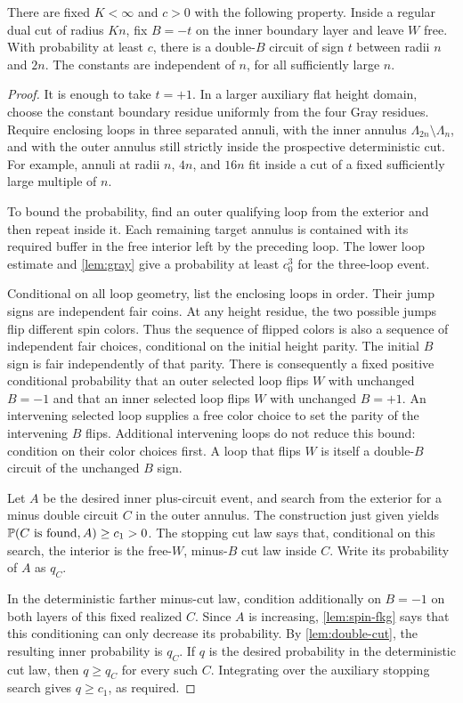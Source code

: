\begin{lemma}\label{lem:worst-cut}
There are fixed $K<\infty$ and $c>0$ with the following property.
Inside a regular dual cut of radius $Kn$, fix $B=-t$ on the inner boundary
layer and leave $W$ free.  With probability at least $c$, there is a
double-$B$ circuit of sign $t$ between radii $n$ and $2n$.  The constants
are independent of $n$, for all sufficiently large $n$.
\end{lemma}

\begin{proof}
It is enough to take $t=+1$.  In a larger auxiliary flat height domain,
choose the constant boundary residue uniformly from the four Gray
residues.  Require enclosing loops in three separated annuli, with the
inner annulus $\Lambda_{2n}\setminus\Lambda_n$, and with the outer
annulus still strictly inside the prospective deterministic cut.  For
example, annuli at radii $n$, $4n$, and $16n$ fit inside a cut of a fixed
sufficiently large multiple of $n$.

To bound the probability, find an outer qualifying loop from the exterior
and then repeat inside it.  Each remaining target annulus is contained
with its required buffer in the free interior left by the preceding loop.
The lower loop estimate and \cref{lem:gray} give a probability at least
$c_0^3$ for the three-loop event.

Conditional on all loop geometry, list the enclosing loops in order.
Their jump signs are independent fair coins.  At any height residue, the
two possible jumps flip different spin colors.  Thus the sequence of
flipped colors is also a sequence of independent fair choices, conditional
on the initial height parity.  The initial $B$ sign is fair independently
of that parity.  There is consequently a fixed positive conditional
probability that an outer selected loop flips $W$ with unchanged $B=-1$
and that an inner selected loop flips $W$ with unchanged $B=+1$.
An intervening selected loop supplies a free color choice to set the
parity of the intervening $B$ flips.  Additional intervening loops do not
reduce this bound: condition on their color choices first.  A loop that
flips $W$ is itself a double-$B$ circuit of the unchanged $B$ sign.

Let $A$ be the desired inner plus-circuit event, and search from the
exterior for a minus double circuit $C$ in the outer annulus.  The
construction just given yields
$\mathbb P(C\hbox{ is found},A)\geq c_1>0$.  The stopping cut law says that,
conditional on this search, the interior is the free-$W$, minus-$B$ cut
law inside $C$.  Write its probability of $A$ as $q_C$.

In the deterministic farther minus-cut law, condition additionally on
$B=-1$ on both layers of this fixed realized $C$.  Since $A$ is increasing,
\cref{lem:spin-fkg} says that this conditioning can only decrease its
probability.  By \cref{lem:double-cut}, the resulting inner probability is
$q_C$.  If $q$ is the desired probability in the deterministic cut law,
then $q\geq q_C$ for every such $C$.  Integrating over the auxiliary
stopping search gives $q\geq c_1$, as required.
\end{proof}

